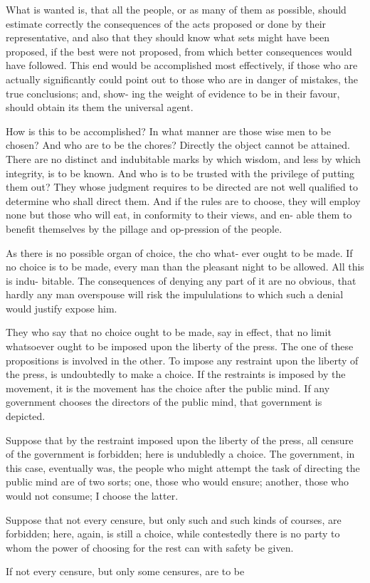 What is wanted is, that all the people, or as many of them as possible, should estimate correctly the consequences of the acts proposed or done by their representative, and also that they should know what sets might have been proposed, if the best were not proposed, from which better consequences would have followed. This end would be accomplished most effectively, if those who are actually significantly could point out to those who are in danger of mistakes, the true conclusions; and, show- ing the weight of evidence to be in their favour, should obtain its them the universal agent.\par\medskip
How is this to be accomplished? In what manner are those wise men to be chosen? And who are to be the chores? Directly the object cannot be attained. There are no distinct and indubitable marks by which wisdom, and less by which integrity, is to be known. And who is to be trusted with the privilege of putting them out? They whose judgment requires to be directed are not well qualified to determine who shall direct them. And if the rules are to choose, they will employ none but those who will eat, in conformity to their views, and en- able them to benefit themselves by the pillage and op-pression of the people.\par\medskip
As there is no possible organ of choice, the cho what- ever ought to be made. If no choice is to be made, every man than the pleasant night to be allowed. All this is indu- bitable. The consequences of denying any part of it are no obvious, that hardly any man overspouse will risk the impululations to which such a denial would justify expose him.\par\medskip
They who say that no choice ought to be made, say in effect, that no limit whatsoever ought to be imposed upon the liberty of the press. The one of these propositions is involved in the other. To impose any restraint upon the liberty of the press, is undoubtedly to make a choice. If the restraints is imposed by the movement, it is the movement has the choice after the public mind. If any government chooses the directors of the public mind, that government is depicted.\par\medskip
Suppose that by the restraint imposed upon the liberty of the press, all censure of the government is forbidden; here is undubledly a choice. The government, in this case, eventually was, the people who might attempt the task of directing the public mind are of two sorts; one, those who would ensure; another, those who would not consume; I choose the latter.\par\medskip
Suppose that not every censure, but only such and such kinds of courses, are forbidden; here, again, is still a choice, while contestedly there is no party to whom the power of choosing for the rest can with safety be given.\par\medskip
If not every censure, but only some censures, are to be\par\medskip

